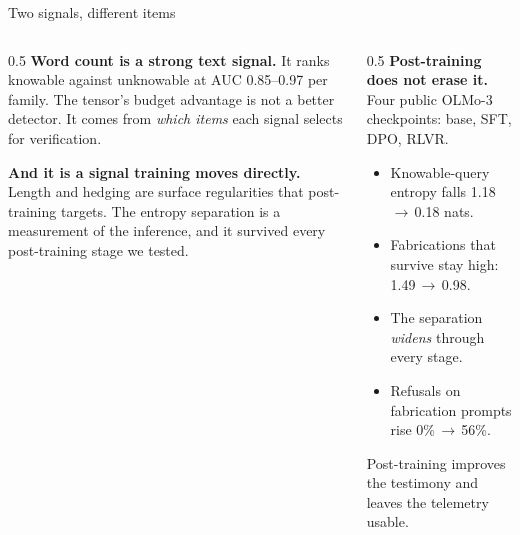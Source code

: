 \documentclass[aspectratio=169,10pt]{beamer}
\begin{document}
\begin{frame}{Two signals, different items}
  \begin{columns}[T]
    \begin{column}{0.5\textwidth}
      \textbf{Word count is a strong text signal.} It ranks knowable
      against unknowable at AUC 0.85--0.97 per family. The tensor's
      budget advantage is not a better detector. It comes from
      \emph{which items} each signal selects for verification.

      \vspace{0.5em}
      \textbf{And it is a signal training moves directly.} Length and
      hedging are surface regularities that post-training targets. The
      entropy separation is a measurement of the inference, and it survived
      every post-training stage we tested.
    \end{column}
    \begin{column}{0.5\textwidth}
      \textbf{Post-training does not erase it.} Four public OLMo-3
      checkpoints: base, SFT, DPO, RLVR.
      \begin{itemize}
        \item Knowable-query entropy falls 1.18\,$\to$\,0.18 nats.
        \item Fabrications that survive stay high: 1.49\,$\to$\,0.98.
        \item The separation \emph{widens} through every stage.
        \item Refusals on fabrication prompts rise 0\%\,$\to$\,56\%.
      \end{itemize}
      \vspace{0.3em}
      Post-training improves the testimony and leaves the telemetry usable.
    \end{column}
  \end{columns}
\end{frame}
\end{document}
